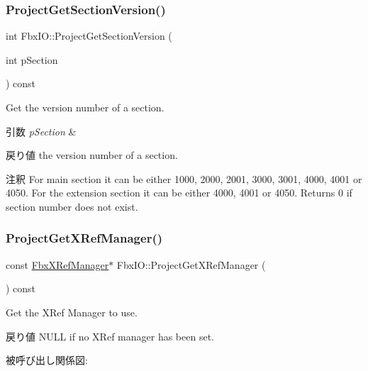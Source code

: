 \subsubsection{\texorpdfstring{Project\+Get\+Section\+Version()}{ProjectGetSectionVersion()}}
{\footnotesize\ttfamily int Fbx\+I\+O\+::\+Project\+Get\+Section\+Version (\begin{DoxyParamCaption}\item[{int}]{p\+Section }\end{DoxyParamCaption}) const}

Get the version number of a section. 
\begin{DoxyParams}{引数}
{\em p\+Section} & \\
\hline
\end{DoxyParams}
\begin{DoxyReturn}{戻り値}
the version number of a section. 
\end{DoxyReturn}
\begin{DoxyRemark}{注釈}
For main section it can be either 1000, 2000, 2001, 3000, 3001, 4000, 4001 or 4050. For the extension section it can be either 4000, 4001 or 4050. Returns 0 if section number does not exist. 
\end{DoxyRemark}
\mbox{\label{class_fbx_i_o_a848f9a7d818160eae6e231cd15ea8c9f}} 
\subsubsection{\texorpdfstring{Project\+Get\+X\+Ref\+Manager()}{ProjectGetXRefManager()}}
{\footnotesize\ttfamily const \hyperlink{class_fbx_x_ref_manager}{Fbx\+X\+Ref\+Manager}$\ast$ Fbx\+I\+O\+::\+Project\+Get\+X\+Ref\+Manager (\begin{DoxyParamCaption}{ }\end{DoxyParamCaption}) const}

Get the X\+Ref Manager to use. \begin{DoxyReturn}{戻り値}
N\+U\+LL if no X\+Ref manager has been set. 
\end{DoxyReturn}
被呼び出し関係図\+:
\mbox{\label{class_fbx_i_o_a767b2b322e766773191b7065d8499d33}} 
